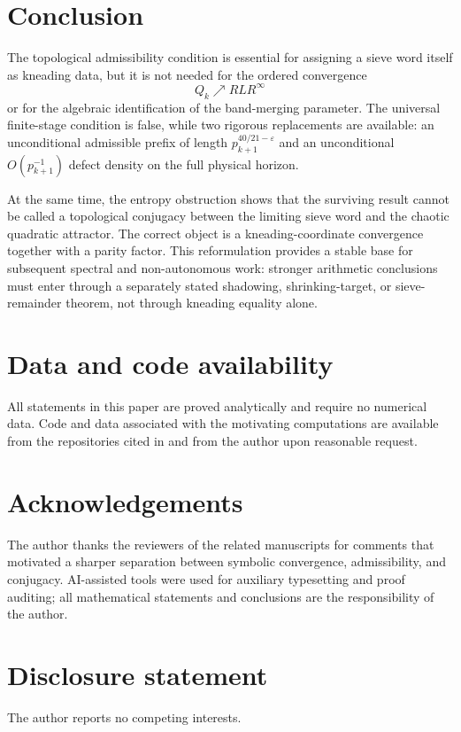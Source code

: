 \documentclass[11pt]{article}
\theoremstyle{definition}
\theoremstyle{remark}
\newcommand{\eps}{\varepsilon}
\begin{document}
\section{Conclusion}

The topological admissibility condition is essential for assigning a sieve word itself as kneading data, but it is not needed for the ordered convergence
\[
    Q_k\nearrow RLR^\infty
\]
or for the algebraic identification of the band-merging parameter.  The universal finite-stage condition is false, while two rigorous replacements are available: an unconditional admissible prefix of length $p_{k+1}^{40/21-\eps}$ and an unconditional $O(p_{k+1}^{-1})$ defect density on the full physical horizon.

At the same time, the entropy obstruction shows that the surviving result cannot be called a topological conjugacy between the limiting sieve word and the chaotic quadratic attractor.  The correct object is a kneading-coordinate convergence together with a parity factor.  This reformulation provides a stable base for subsequent spectral and non-autonomous work: stronger arithmetic conclusions must enter through a separately stated shadowing, shrinking-target, or sieve-remainder theorem, not through kneading equality alone.

\section*{Data and code availability}

All statements in this paper are proved analytically and require no numerical data.  Code and data associated with the motivating computations are available from the repositories cited in \citet{Wang2026Published,WangTransient2026} and from the author upon reasonable request.

\section*{Acknowledgements}

The author thanks the reviewers of the related manuscripts for comments that motivated a sharper separation between symbolic convergence, admissibility, and conjugacy.  AI-assisted tools were used for auxiliary typesetting and proof auditing; all mathematical statements and conclusions are the responsibility of the author.

\section*{Disclosure statement}

The author reports no competing interests.



\end{document}
